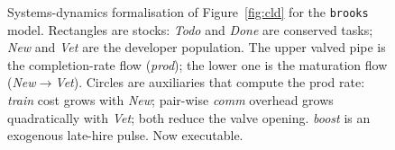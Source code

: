 \documentclass[10pt,conference]{IEEEtran}
\begin{document}
\begin{figure}[t]
\caption{Systems-dynamics formalisation of Figure~\ref{fig:cld}
for the \texttt{brooks} model. Rectangles are stocks: \emph{Todo}
and \emph{Done} are conserved tasks; \emph{New} and \emph{Vet} are
the developer population. The upper valved pipe is the
completion-rate flow (\emph{prod}); the lower one is the
maturation flow (\emph{New}$\!\to\!$\emph{Vet}). Circles are
auxiliaries that compute the prod rate: \emph{train} cost grows
with \emph{New}; pair-wise \emph{comm} overhead grows
quadratically with \emph{Vet}; both reduce the valve opening.
\emph{boost} is an exogenous late-hire pulse. Now executable.}
\label{fig:sd}
\end{figure}
\end{document}
